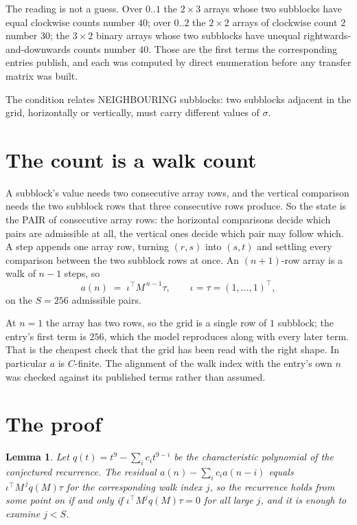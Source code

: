 \documentclass[11pt,a4paper]{article}
\theoremstyle{plain}
\newtheorem{lemma}[theorem]{Lemma}
\theoremstyle{definition}
\begin{document}
The reading is not a guess. Over $0..1$ the $2\times3$ arrays whose two subblocks have equal
clockwise counts number $40$; over $0..2$ the $2\times2$ arrays of clockwise count $2$ number
$30$; the $3\times2$ binary arrays whose two subblocks have unequal rightwards-and-downwards
counts number $40$. Those are the first terms the corresponding entries publish, and each was
computed by direct enumeration before any transfer matrix was built.

The condition relates NEIGHBOURING subblocks: two subblocks adjacent in the grid, horizontally
or vertically, must carry different values of $\sigma$.

\section{The count is a walk count}

A subblock's value needs two consecutive array rows, and the vertical
comparison needs the two subblock rows that three consecutive rows produce. So the state is the
PAIR of consecutive array rows: the horizontal comparisons decide which pairs are admissible at
all, the vertical ones decide which pair may follow which. A step appends one array row,
turning $(r,s)$ into $(s,t)$ and settling every comparison between the two subblock rows at
once. An $(n+1)$-row array is a walk of $n-1$ steps, so
\[
a(n)\;=\;\iota^{\!\top}M^{\,n-1}\tau,\qquad\iota=\tau=(1,\dots,1)^{\!\top},
\]
on the $S=256$ admissible pairs.

At $n=1$ the array has two rows, so the grid is a single row of $1$
subblock; the entry's first term is $256$, which the model
reproduces along with every later term. That is the cheapest check that the grid has been read
with the right shape.
In particular $a$ is $C$-finite. The alignment of the walk index with the entry's own $n$ was
checked against its published terms rather than assumed.

\section{The proof}

\begin{lemma}\label{lem:crit}
Let $q(t)=t^{9}-\sum_i c_it^{9-i}$ be the characteristic polynomial of the
conjectured recurrence. The residual $a(n)-\sum_ic_ia(n-i)$ equals
$\iota^{\!\top}M^{\,j}q(M)\tau$ for the corresponding walk index $j$, so the recurrence
holds from some point on if and only if $\iota^{\!\top}M^{j}q(M)\tau=0$ for all large $j$,
and it is enough to examine $j<S$.
\end{lemma}
\end{document}
